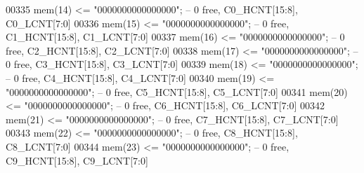 \begin{DoxyCode}
00335       \textcolor{vhdlchar}{mem}\textcolor{vhdlchar}{(}\textcolor{vhdllogic}{}\textcolor{vhdllogic}{14}\textcolor{vhdlchar}{)}  \textcolor{vhdlchar}{<=} \textcolor{vhdllogic}{"0000000000000000"};\textcolor{keyword}{ -- 0  free, C0\_HCNT[15:8], C0\_LCNT[7:0]}
00336       \textcolor{vhdlchar}{mem}\textcolor{vhdlchar}{(}\textcolor{vhdllogic}{}\textcolor{vhdllogic}{15}\textcolor{vhdlchar}{)}  \textcolor{vhdlchar}{<=} \textcolor{vhdllogic}{"0000000000000000"};\textcolor{keyword}{ -- 0  free, C1\_HCNT[15:8], C1\_LCNT[7:0]}
00337       \textcolor{vhdlchar}{mem}\textcolor{vhdlchar}{(}\textcolor{vhdllogic}{}\textcolor{vhdllogic}{16}\textcolor{vhdlchar}{)}  \textcolor{vhdlchar}{<=} \textcolor{vhdllogic}{"0000000000000000"};\textcolor{keyword}{ -- 0  free, C2\_HCNT[15:8], C2\_LCNT[7:0]}
00338       \textcolor{vhdlchar}{mem}\textcolor{vhdlchar}{(}\textcolor{vhdllogic}{}\textcolor{vhdllogic}{17}\textcolor{vhdlchar}{)}  \textcolor{vhdlchar}{<=} \textcolor{vhdllogic}{"0000000000000000"};\textcolor{keyword}{ -- 0  free, C3\_HCNT[15:8], C3\_LCNT[7:0]}
00339       \textcolor{vhdlchar}{mem}\textcolor{vhdlchar}{(}\textcolor{vhdllogic}{}\textcolor{vhdllogic}{18}\textcolor{vhdlchar}{)}  \textcolor{vhdlchar}{<=} \textcolor{vhdllogic}{"0000000000000000"};\textcolor{keyword}{ -- 0  free, C4\_HCNT[15:8], C4\_LCNT[7:0]}
00340       \textcolor{vhdlchar}{mem}\textcolor{vhdlchar}{(}\textcolor{vhdllogic}{}\textcolor{vhdllogic}{19}\textcolor{vhdlchar}{)}  \textcolor{vhdlchar}{<=} \textcolor{vhdllogic}{"0000000000000000"};\textcolor{keyword}{ -- 0  free, C5\_HCNT[15:8], C5\_LCNT[7:0]}
00341       \textcolor{vhdlchar}{mem}\textcolor{vhdlchar}{(}\textcolor{vhdllogic}{}\textcolor{vhdllogic}{20}\textcolor{vhdlchar}{)}  \textcolor{vhdlchar}{<=} \textcolor{vhdllogic}{"0000000000000000"};\textcolor{keyword}{ -- 0  free, C6\_HCNT[15:8], C6\_LCNT[7:0]}
00342       \textcolor{vhdlchar}{mem}\textcolor{vhdlchar}{(}\textcolor{vhdllogic}{}\textcolor{vhdllogic}{21}\textcolor{vhdlchar}{)}  \textcolor{vhdlchar}{<=} \textcolor{vhdllogic}{"0000000000000000"};\textcolor{keyword}{ -- 0  free, C7\_HCNT[15:8], C7\_LCNT[7:0]}
00343       \textcolor{vhdlchar}{mem}\textcolor{vhdlchar}{(}\textcolor{vhdllogic}{}\textcolor{vhdllogic}{22}\textcolor{vhdlchar}{)}  \textcolor{vhdlchar}{<=} \textcolor{vhdllogic}{"0000000000000000"};\textcolor{keyword}{ -- 0  free, C8\_HCNT[15:8], C8\_LCNT[7:0]}
00344       \textcolor{vhdlchar}{mem}\textcolor{vhdlchar}{(}\textcolor{vhdllogic}{}\textcolor{vhdllogic}{23}\textcolor{vhdlchar}{)}  \textcolor{vhdlchar}{<=} \textcolor{vhdllogic}{"0000000000000000"};\textcolor{keyword}{ -- 0  free, C9\_HCNT[15:8], C9\_LCNT[7:0]}

\end{DoxyCode}
